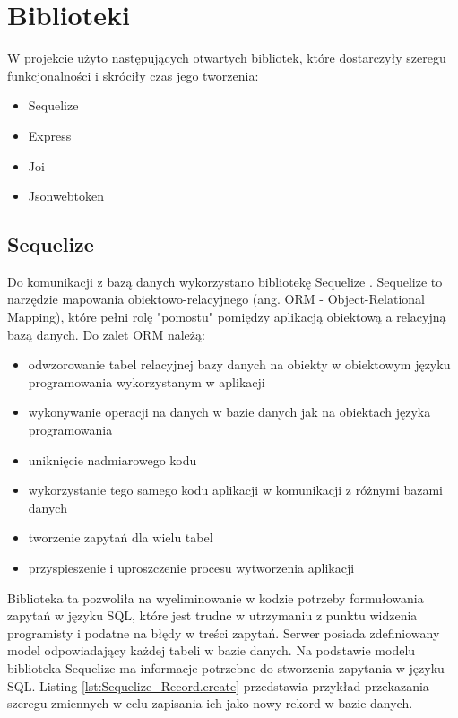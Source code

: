 \documentclass{sprz}
\begin{document}
\section{Biblioteki}

W projekcie użyto następujących otwartych bibliotek, które dostarczyły szeregu funkcjonalności i skróciły czas jego tworzenia:
\begin{itemize}
  \item Sequelize
  \item Express
  \item Joi
  \item Jsonwebtoken
\end{itemize}

\subsection{Sequelize}

Do komunikacji z bazą danych wykorzystano bibliotekę Sequelize \cite{sequelize}. Sequelize to narzędzie mapowania obiektowo-relacyjnego (ang. ORM - Object-Relational Mapping), które pełni rolę "pomostu" pomiędzy aplikacją obiektową a relacyjną bazą danych.
Do zalet ORM należą:
\begin{itemize}
  \item odwzorowanie tabel relacyjnej bazy danych na obiekty w obiektowym języku programowania wykorzystanym w aplikacji
  \item wykonywanie operacji na danych w bazie danych jak na obiektach języka programowania
  \item uniknięcie nadmiarowego kodu
  \item wykorzystanie tego samego kodu aplikacji w komunikacji z różnymi bazami danych
  \item tworzenie zapytań dla wielu tabel
  \item przyspieszenie i uproszczenie procesu wytworzenia aplikacji
\end{itemize}

Biblioteka ta pozwoliła na wyeliminowanie w kodzie potrzeby formułowania zapytań w języku SQL, które jest trudne w utrzymaniu z punktu widzenia programisty i podatne na błędy w treści zapytań. Serwer posiada zdefiniowany model odpowiadający każdej tabeli w bazie danych. Na podstawie modelu biblioteka Sequelize ma informacje potrzebne do stworzenia zapytania w języku SQL. Listing \ref{lst:Sequelize_Record.create} przedstawia przykład przekazania szeregu zmiennych w celu zapisania ich jako nowy rekord w bazie danych.
\end{document}
